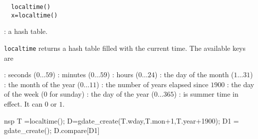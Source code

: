 \begin{mandesc}
\end{mandesc}

\begin{calling_sequence}
\begin{verbatim}
  localtime()
  x=localtime()  
\end{verbatim}
\end{calling_sequence}
\begin{parameters}
  \begin{varlist}
    : a hash table.
  \end{varlist}
\end{parameters}
\begin{mandescription}
  \verb!localtime! returns a hash table filled with the
  current time. The available keys are
  \begin{varlist}
  : seconds ($0 \dots 59$)
  : minutes ($0 \dots 59$)
  : hours ($0 \dots 24$)
  : the day of the month ($1 \dots 31$)
  : the month of the year ($0 \dots 11$)
  : the number of years elapsed since $1900$
  : the day of the week ($0$ for sunday)
  : the day of the year ($0 \dots 365$)
  : is summer time in effect. It can $0$ or $1$.
  \end{varlist}
\end{mandescription} 
\begin{examples}
  \begin{mintednsp}{nsp}
    T  =localtime();
    D=gdate_create(T.wday,T.mon+1,T.year+1900);
    D1 = gdate_create();
    D.compare[D1]
  \end{mintednsp}
\end{examples}
